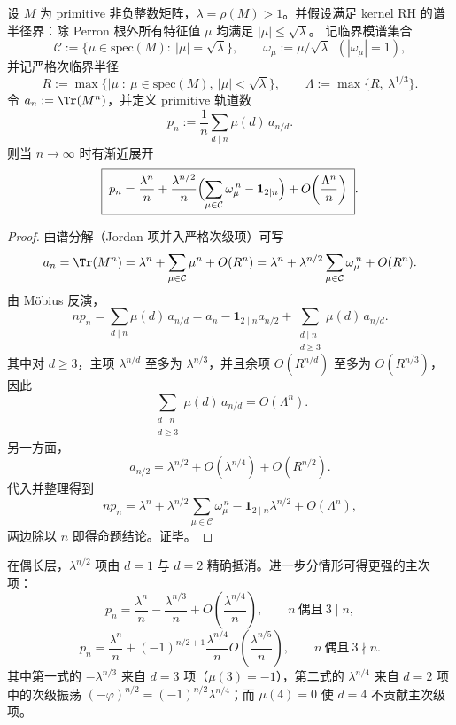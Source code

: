\begin{proposition}[平方根项的相位共振公式：临界模谱与 \texorpdfstring{$d=2$}{d=2} 项的干涉]\label{prop:finite-rh-sqrt-resonance-general}
设 \(M\) 为 primitive 非负整数矩阵，\(\lambda=\rho(M)>1\)。并假设满足 kernel RH 的谱半径界：除 Perron 根外所有特征值 \(\mu\) 均满足 \(|\mu|\le \sqrt{\lambda}\)。
记临界模谱集合
\[
\mathcal{C}:=\{\mu\in\mathrm{spec}(M):\ |\mu|=\sqrt{\lambda}\},
\qquad
\omega_\mu:=\mu/\sqrt{\lambda}\ \ (|\omega_\mu|=1),
\]
并记严格次临界半径
\[
R:=\max\{|\mu|:\ \mu\in\mathrm{spec}(M),\ |\mu|<\sqrt{\lambda}\},
\qquad
\Lambda:=\max\{R,\ \lambda^{1/3}\}.
\]
令 \(a_n:=\Tr(M^n)\)，并定义 primitive 轨道数
\[
p_n:=\frac{1}{n}\sum_{d\mid n}\mu(d)\,a_{n/d}.
\]
则当 \(n\to\infty\) 时有渐近展开
\[
\boxed{\;
p_n
=\frac{\lambda^n}{n}
+\frac{\lambda^{n/2}}{n}\Bigl(\sum_{\mu\in\mathcal{C}}\omega_\mu^{\,n}-\mathbf{1}_{2\mid n}\Bigr)
+O\!\left(\frac{\Lambda^n}{n}\right)\; }.
\]
\end{proposition}
\begin{proof}
由谱分解（Jordan 项并入严格次级项）可写
\[
a_n=\Tr(M^n)=\lambda^n+\sum_{\mu\in\mathcal{C}}\mu^n+O(R^n)
=\lambda^n+\lambda^{n/2}\sum_{\mu\in\mathcal{C}}\omega_\mu^{\,n}+O(R^n).
\]
由 Möbius 反演，
\[
np_n=\sum_{d\mid n}\mu(d)\,a_{n/d}
=a_n-\mathbf{1}_{2\mid n}a_{n/2}+\sum_{\substack{d\mid n\\ d\ge 3}}\mu(d)\,a_{n/d}.
\]
其中对 \(d\ge 3\)，主项 \(\lambda^{n/d}\) 至多为 \(\lambda^{n/3}\)，并且余项 \(O(R^{n/d})\) 至多为 \(O(R^{n/3})\)，因此
\[
\sum_{\substack{d\mid n\\ d\ge 3}}\mu(d)\,a_{n/d}=O(\Lambda^n).
\]
另一方面，
\[
a_{n/2}=\lambda^{n/2}+O(\lambda^{n/4})+O(R^{n/2}).
\]
代入并整理得到
\[
np_n=\lambda^n+\lambda^{n/2}\sum_{\mu\in\mathcal{C}}\omega_\mu^{\,n}-\mathbf{1}_{2\mid n}\lambda^{n/2}+O(\Lambda^n),
\]
两边除以 \(n\) 即得命题结论。证毕。
\end{proof}

\begin{remark}\label{rem:finite-rh-even-strengthen}
在偶长层，$\lambda^{n/2}$ 项由 $d=1$ 与 $d=2$ 精确抵消。进一步分情形可得更强的主次项：
\[
p_n=\frac{\lambda^n}{n}-\frac{\lambda^{n/3}}{n}+O\!\left(\frac{\lambda^{n/4}}{n}\right),
\qquad n\ \text{偶且}\ 3\mid n,
\]
\[
p_n=\frac{\lambda^n}{n}+(-1)^{n/2+1}\frac{\lambda^{n/4}}{n}
O\!\left(\frac{\lambda^{n/5}}{n}\right),
\qquad n\ \text{偶且}\ 3\nmid n.
\]
其中第一式的 $-\lambda^{n/3}$ 来自 $d=3$ 项（$\mu(3)=-1$），第二式的 $\lambda^{n/4}$ 来自 $d=2$ 项中的次级振荡
$(-\varphi)^{n/2}=(-1)^{n/2}\lambda^{n/4}$；而 $\mu(4)=0$ 使 $d=4$ 不贡献主次级项。
\end{remark}

